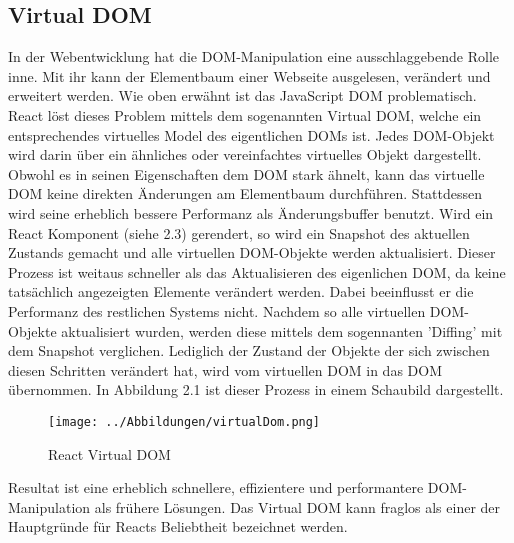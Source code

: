 \subsection{Virtual DOM}
In der Webentwicklung hat die DOM-Manipulation eine ausschlaggebende Rolle inne. Mit ihr kann der Elementbaum einer Webseite ausgelesen, verändert und erweitert werden. Wie oben erwähnt ist das JavaScript DOM problematisch.\\
React löst dieses Problem mittels dem sogenannten Virtual DOM, welche ein entsprechendes virtuelles Model des eigentlichen DOMs ist. Jedes DOM-Objekt wird darin über ein ähnliches oder vereinfachtes virtuelles Objekt dargestellt. Obwohl es in seinen Eigenschaften dem DOM stark ähnelt, kann das virtuelle DOM keine direkten Änderungen am Elementbaum durchführen. Stattdessen wird seine erheblich bessere Performanz als Änderungsbuffer benutzt. Wird ein React Komponent (siehe 2.3) gerendert, so wird ein Snapshot des aktuellen Zustands gemacht und alle virtuellen DOM-Objekte werden aktualisiert. Dieser Prozess ist weitaus schneller als das Aktualisieren des eigenlichen DOM, da keine tatsächlich angezeigten Elemente verändert werden. Dabei beeinflusst er die Performanz des restlichen Systems nicht. Nachdem so alle virtuellen DOM-Objekte aktualisiert wurden, werden diese mittels dem sogennanten 'Diffing' mit dem Snapshot verglichen. Lediglich der Zustand der Objekte der sich zwischen diesen Schritten verändert hat, wird vom virtuellen DOM in das DOM übernommen. In Abbildung 2.1 ist dieser Prozess in einem Schaubild dargestellt.\\
\begin{figure}[H]
     \centerline{\texttt{[image: ../Abbildungen/virtualDom.png]}}
  \caption{React Virtual DOM}
  \label{React Virtual DOM}
\end{figure}
\noindent Resultat ist eine erheblich schnellere, effizientere und performantere DOM-Manipulation als frühere Lösungen. Das Virtual DOM kann fraglos als einer der Hauptgründe für Reacts Beliebtheit bezeichnet werden.
